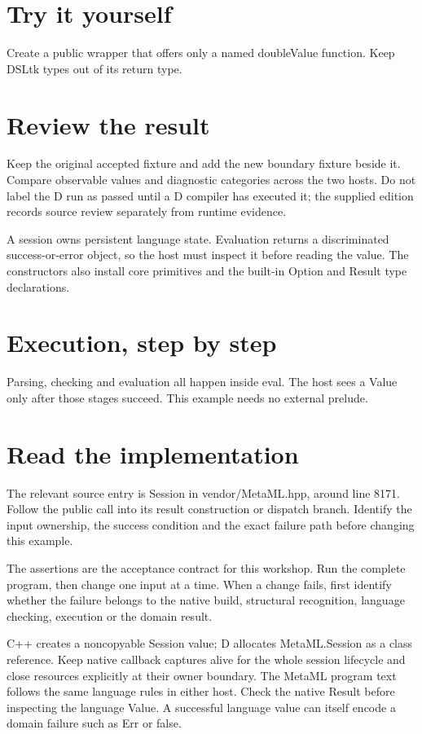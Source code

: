 \section*{Try it yourself}
Create a public wrapper that offers only a named doubleValue function. Keep DSLtk types out of its return type.

\section*{Review the result}
Keep the original accepted fixture and add the new boundary fixture beside it. Compare observable values and diagnostic categories across the two hosts. Do not label the D run as passed until a D compiler has executed it; the supplied edition records source review separately from runtime evidence.

\clearpage
{}
A session owns persistent language state. Evaluation returns a discriminated success-or-error object, so the host must inspect it before reading the value. The constructors also install core primitives and the built-in Option and Result type declarations.


\section*{Execution, step by step}
Parsing, checking and evaluation all happen inside eval. The host sees a Value only after those stages succeed. This example needs no external prelude.

\section*{Read the implementation}
The relevant source entry is Session in vendor/MetaML.hpp, around line 8171. Follow the public call into its result construction or dispatch branch. Identify the input ownership, the success condition and the exact failure path before changing this example.

The assertions are the acceptance contract for this workshop. Run the complete program, then change one input at a time. When a change fails, first identify whether the failure belongs to the native build, structural recognition, language checking, execution or the domain result.

\clearpage
{}
C++ creates a noncopyable Session value; D allocates MetaML.Session as a class reference. Keep native callback captures alive for the whole session lifecycle and close resources explicitly at their owner boundary. The MetaML program text follows the same language rules in either host. Check the native Result before inspecting the language Value. A successful language value can itself encode a domain failure such as Err or false.

